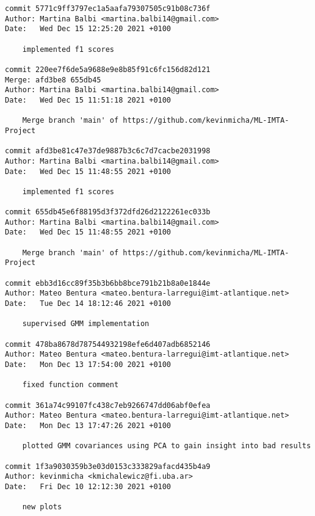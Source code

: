 \documentclass[11pt,a4paper]{article}
\begin{document}
\newpage
\begin{IMTAannexes}
	
	
\label{sec:S_ANN_EX}

\begin{verbatim}
commit 5771c9ff3797ec1a5aafa79307505c91b08c736f
Author: Martina Balbi <martina.balbi14@gmail.com>
Date:   Wed Dec 15 12:25:20 2021 +0100

    implemented f1 scores

commit 220ee7f6de5a9688e9e8b85f91c6fc156d82d121
Merge: afd3be8 655db45
Author: Martina Balbi <martina.balbi14@gmail.com>
Date:   Wed Dec 15 11:51:18 2021 +0100

    Merge branch 'main' of https://github.com/kevinmicha/ML-IMTA-Project

commit afd3be81c47e37de9887b3c6c7d7cacbe2031998
Author: Martina Balbi <martina.balbi14@gmail.com>
Date:   Wed Dec 15 11:48:55 2021 +0100

    implemented f1 scores

commit 655db45e6f88195d3f372dfd26d2122261ec033b
Author: Martina Balbi <martina.balbi14@gmail.com>
Date:   Wed Dec 15 11:48:55 2021 +0100

    Merge branch 'main' of https://github.com/kevinmicha/ML-IMTA-Project

commit ebb3d16cc89f35b3b6bb8bce791b21b8a0e1844e
Author: Mateo Bentura <mateo.bentura-larregui@imt-atlantique.net>
Date:   Tue Dec 14 18:12:46 2021 +0100

    supervised GMM implementation

commit 478ba8678d787544932198efe6d407adb6852146
Author: Mateo Bentura <mateo.bentura-larregui@imt-atlantique.net>
Date:   Mon Dec 13 17:54:00 2021 +0100

    fixed function comment

commit 361a74c99107fc438c7eb9266747dd06abf0efea
Author: Mateo Bentura <mateo.bentura-larregui@imt-atlantique.net>
Date:   Mon Dec 13 17:47:26 2021 +0100

    plotted GMM covariances using PCA to gain insight into bad results

commit 1f3a9030359b3e03d0153c333829afacd435b4a9
Author: kevinmicha <kmichalewicz@fi.uba.ar>
Date:   Fri Dec 10 12:12:30 2021 +0100

    new plots


\end{verbatim}
\end{IMTAannexes}
\end{document}
